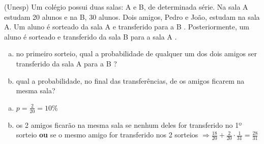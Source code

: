 \begin{ex}
(Unesp) Um colégio possui duas salas: A e B, de determinada série. Na sala A estudam 20 alunos e na B, 30 alunos. Dois amigos, Pedro e João, estudam na sala A. Um aluno é sorteado da sala A e transferido para a B . Posteriormente, um aluno é sorteado e transferido da sala B  para a sala A .
 \begin{enumerate} [(a)]
     \item no primeiro sorteio, qual a probabilidade de qualquer um dos dois amigos ser transferido da sala A para a B ?
     \item qual a probabilidade, no final das transferências, de os amigos ficarem na mesma sala?
 \end{enumerate}
   \begin{sol}
     \phantom{A}
       \begin{enumerate} [(a)]
           \item $p=\frac{2}{20}=10\%$
           \item os 2 amigos ficarão na mesma sala se nenhum deles for transferido no 1º sorteio  \textbf{ou} se o mesmo amigo for transferido nos 2 sorteios $\Longrightarrow \frac{18}{20}+\frac{2}{20}\cdot\frac{1}{31}=\frac{28}{31}$
       \end{enumerate}
   \end{sol}

\end{ex}
